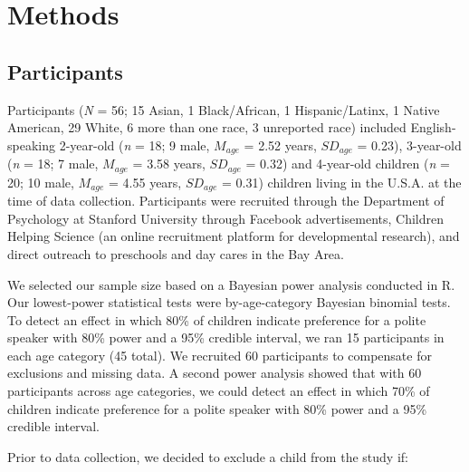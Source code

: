\documentclass[
  english,
  man,floatsintext]{apa6}
\begin{document}
\newpage

\hypertarget{methods}{%
\section{Methods}\label{methods}}

\hypertarget{participants}{%
\subsection{Participants}\label{participants}}

Participants (\emph{N} = 56; 15 Asian, 1 Black/African, 1 Hispanic/Latinx, 1 Native American, 29 White, 6 more than one race, 3 unreported race) included English-speaking 2-year-old (\emph{n} = 18; 9 male, \(M_{age}\) = 2.52 years, \(SD_{age}\) = 0.23), 3-year-old (\emph{n} = 18; 7 male, \(M_{age}\) = 3.58 years, \(SD_{age}\) = 0.32) and 4-year-old children (\emph{n} = 20; 10 male, \(M_{age}\) = 4.55 years, \(SD_{age}\) = 0.31) children living in the U.S.A. at the time of data collection. Participants were recruited through the Department of Psychology at Stanford University through Facebook advertisements, Children Helping Science (an online recruitment platform for developmental research), and direct outreach to preschools and day cares in the Bay Area.

We selected our sample size based on a Bayesian power analysis conducted in R. Our lowest-power statistical tests were by-age-category Bayesian binomial tests. To detect an effect in which 80\% of children indicate preference for a polite speaker with 80\% power and a 95\% credible interval, we ran 15 participants in each age category (45 total). We recruited 60 participants to compensate for exclusions and missing data. A second power analysis showed that with 60 participants across age categories, we could detect an effect in which 70\% of children indicate preference for a polite speaker with 80\% power and a 95\% credible interval.

Prior to data collection, we decided to exclude a child from the study if:
\end{document}
